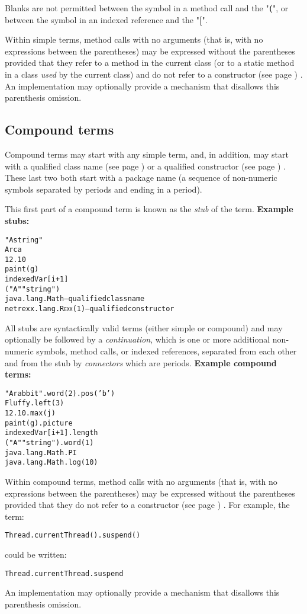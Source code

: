 Blanks are not permitted between the symbol in a method call and the
"\textbf{(}", or between the symbol in an indexed reference and
the "\textbf{[}".
 
Within simple terms, method calls with no arguments (that is, with no
expressions between the parentheses) may be expressed without the
parentheses provided that they refer to a method in the current class
(or to a static method in a class \emph{used} by the current class)
and do not refer to a  constructor (see page \pageref{refcons}) .
An implementation may optionally provide a mechanism that disallows this
parenthesis omission.
\subsection{Compound terms}\label{refcomterm}
 
Compound terms may start with any simple term, and, in addition, may
start with a  qualified class name (see page \pageref{refpackage})  or a
 qualified constructor (see page \pageref{refmethcon}) .
These last two both start with a package name (a sequence of non-numeric
symbols separated by periods and ending in a period).
 
This first part of a compound term is known as the \emph{stub} of the
term.
 \textbf{Example stubs:}
\begin{alltt}
"A string"
Arca
12.10
paint(g)
indexedVar[i+1]
("A" "string")
java.lang.Math        -- qualified class name
netrexx.lang.R\textsc{exx}(1)  -- qualified constructor
\end{alltt}
 
All stubs are syntactically valid terms (either simple or compound) and
may optionally be followed by a \emph{continuation}, which is one or
more additional non-numeric symbols, method calls, or indexed
references, separated from each other and from the stub by
\emph{connectors} which are periods.
 \textbf{Example compound terms:}
\begin{alltt}
"A rabbit".word(2).pos('b')
Fluffy.left(3)
12.10.max(j)
paint(g).picture
indexedVar[i+1].length
("A" "string").word(1)
java.lang.Math.PI
java.lang.Math.log(10)
\end{alltt}
 
Within compound terms, method calls with no arguments (that is, with no
expressions between the parentheses) may be expressed without the
parentheses provided that they do not refer to a
 constructor (see page \pageref{refcons}) .
For example, the term:
\begin{lstlisting}
Thread.currentThread().suspend()
\end{lstlisting}
could be written:
\begin{lstlisting}
Thread.currentThread.suspend
\end{lstlisting}
An implementation may optionally provide a mechanism that disallows this
parenthesis omission.
